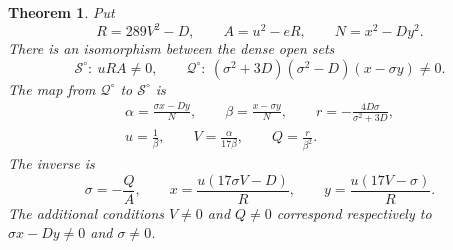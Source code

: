 \documentclass[11pt,a4paper]{article}
\newtheorem{theorem}{Theorem}[section]
\theoremstyle{remark}\newtheorem{remark}[theorem]{Remark}
\begin{document}
\begin{theorem}\label{thm:maps}
Put
\[
 R=289V^2-D,\qquad A=u^2-eR,
 \qquad N=x^2-Dy^2.
\]
There is an isomorphism between the dense open sets
\begin{equation}\label{eq:opens}
 \mathcal S^\circ:\ uRA\ne0,
 \qquad
 \mathcal Q^\circ:\
      (\sigma^2+3D)(\sigma^2-D)(x-\sigma y)\ne0.
\end{equation}
The map from $\mathcal Q^\circ$ to $\mathcal S^\circ$ is
\begin{equation}\label{eq:forward}
 \begin{gathered}
 \alpha=\frac{\sigma x-Dy}{N},\qquad
 \beta=\frac{x-\sigma y}{N},\qquad
 r=-\frac{4D\sigma}{\sigma^2+3D},\\
 u=\frac1\beta,\qquad
 V=\frac\alpha{17\beta},\qquad
 Q=\frac r{\beta^2}.
 \end{gathered}
\end{equation}
The inverse is
\begin{equation}\label{eq:reverse}
 \sigma=-\frac QA,\qquad
 x=\frac{u(17\sigma V-D)}R,\qquad
 y=\frac{u(17V-\sigma)}R.
\end{equation}
The additional conditions $V\ne0$ and $Q\ne0$ correspond respectively
to $\sigma x-Dy\ne0$ and $\sigma\ne0$.
\end{theorem}
\end{document}
